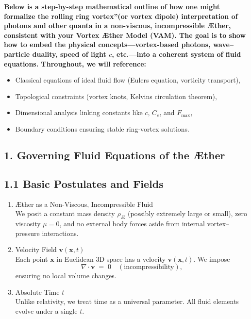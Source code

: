 
\textbf{Below is a step-by-step mathematical outline of how one might formalize the \grqq rolling ring vortex\textquotedblright (or vortex dipole) interpretation of photons and other quanta in a non-viscous, incompressible Æther, consistent with your Vortex Æther Model (VAM). The goal is to show how to embed the physical concepts—vortex-based photons, wave–particle duality, speed of light \(c\), etc.—into a coherent system of fluid equations. Throughout, we will reference:}

\begin{itemize}
 \item Classical equations of ideal fluid flow (Euler\rqs s equation, vorticity transport),
 \item Topological constraints (vortex knots, Kelvin\rqs s circulation theorem),
 \item Dimensional analysis linking constants like \(c\), \(C_e\), and \(F_{\max}\),
 \item Boundary conditions ensuring stable ring-vortex solutions.
\end{itemize}

\subsection*{1. Governing Fluid Equations of the Æther}
\subsection*{1.1 Basic Postulates and Fields}
\begin{enumerate}
 \item Æther as a Non-Viscous, Incompressible Fluid\\
 We posit a constant mass density \(\rho_{\scriptscriptstyle \mathrm{Æ}}\) (possibly extremely large or small), zero viscosity \(\mu=0\), and no external body forces aside from internal vortex–pressure interactions.

 \item Velocity Field \(\mathbf{v}(\mathbf{x},t)\)\\
 Each point \(\mathbf{x}\) in Euclidean 3D space has a velocity \(\mathbf{v}(\mathbf{x},t)\). We impose
 \[
  \nabla \cdot \mathbf{v} \;=\; 0 \quad (\text{incompressibility}),
 \]
 ensuring no local volume changes.

 \item Absolute Time \(t\)\\
 Unlike relativity, we treat time as a universal parameter. All fluid elements evolve under a single \(t\).
\end{enumerate}

